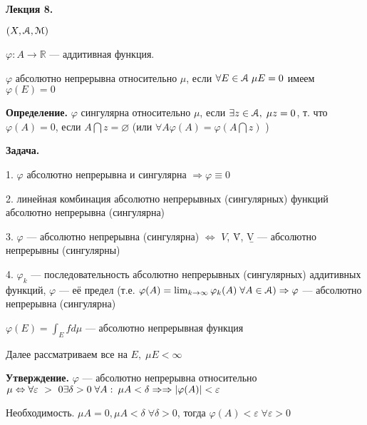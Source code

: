 

\begin{center} \textbf{Лекция 8.} \end{center}
%
%
%
%
%
%
%
%
%
%
%
%


$(X, \EuScript{A}, \EuScript{M})$

$\varphi: A \rightarrow \mathbb{R}$ --- аддитивная функция.

$\varphi$ абсолютно непрерывна относительно $\mu$, если $\forall E
\in \EuScript{A} \; \mu E = 0 $ имеем $\varphi(E) = 0$

\textbf{Определение.} \quad $\varphi$ сингулярна относительно
$\mu$, если $\exists z \in \EuScript{A}, \; \mu z = 0$, т. что
$\varphi(A) = 0$, если $A \bigcap z = \varnothing$ (или $\forall A
\varphi(A) = \varphi(A \bigcap z)$ )

\textbf{Задача.} \quad

1. \quad $\varphi$ абсолютно непрерывна и сингулярна $\Rightarrow
\varphi \equiv 0$

2. \quad линейная комбинация абсолютно непрерывных (сингулярных)
функций абсолютно непрерывна (сингулярна)

3. \quad $\varphi$ --- абсолютно непрерывна (сингулярна)
$\Leftrightarrow$ $V$, \={V}, \b{V} --- абсолютно непрерывны
(сингулярны)

4. \quad $\varphi_k$ --- последовательность абсолютно непрерывных
(сингулярных) аддитивных функций, $\varphi$ --- её предел (т.е.
$\varphi (A) = \lim_{k \rightarrow \infty} \varphi_k (A) \;
\forall A \in \EuScript{A}) \Rightarrow \varphi $ --- абсолютно
непрерывна (сингулярна)

$\varphi(E) = \int_E f d \mu$ --- абсолютно непрерывная функция

Далее рассматриваем все на $E, \; \mu E < \infty$

\textbf{Утверждение.} \quad $\varphi$ --- абсолютно непрерывна
относительно $\mu \Leftrightarrow \forall \varepsilon~>~0
\\ \exists \delta
> 0 \; \forall A: \: \mu A < \delta \Rightarrow \Rightarrow
|\varphi(A)| < \varepsilon$

Необходимость. $\mu A = 0, \mu A < \delta \; \forall \delta > 0$,
 тогда $\varphi(A) < \varepsilon \; \forall \varepsilon > 0$

